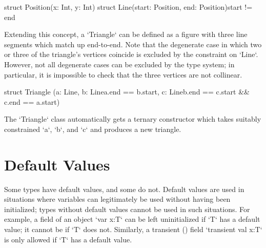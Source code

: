 \begin{xten}
struct Position(x: Int, y: Int) {}
struct Line(start: Position, end: Position){start != end} {}
\end{xten}


Extending this concept, a \xcd`Triangle` can be defined as a figure with three
line segments which match up end-to-end.  Note that the degenerate case in
which two or three of the triangle's vertices coincide is excluded by the
constraint on \xcd`Line`.  However, not all degenerate cases can be excluded
by the type system; in particular, it is impossible to check that the three
vertices are not collinear. 

% 
\begin{xten}
struct Triangle 
 (a: Line, 
  b: Line{a.end == b.start}, 
  c: Line{b.end == c.start && c.end == a.start})  
 {}
\end{xten}
%

The \xcd`Triangle` class automatically gets a ternary constructor which takes
suitably constrained \xcd`a`, \xcd`b`, and \xcd`c` and produces a new
triangle. 

\section{Default Values}
\label{DefaultValues}

Some types have default values, and some do not. Default values are used in
situations where variables can legitimately be used without having been
initialized; types without default values cannot be used in such situations.
For example, a field of an object \xcd`var x:T` can be left uninitialized if
\xcd`T` has a default value; it cannot be if \xcd`T` does not. Similarly, a
transient () field \xcd`transient val x:T` is only
allowed if \xcd`T` has a default value.


